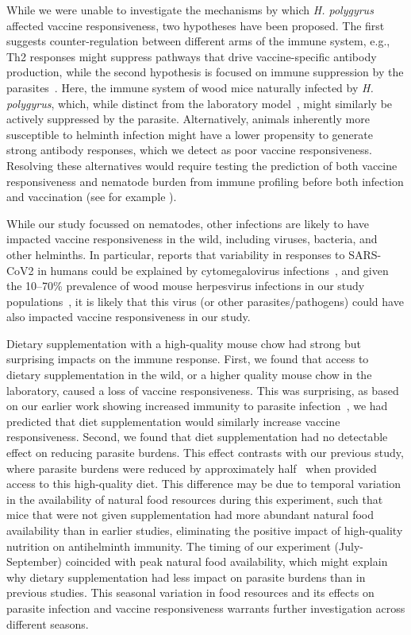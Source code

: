 \documentclass[a4paper, hidelinks, 11pt]{article}
\begin{document}
While we were unable to investigate the mechanisms by which \textit{H. polygyrus} affected vaccine responsiveness, two hypotheses have been proposed. The first suggests counter-regulation between different arms of the immune system, e.g., Th2 responses might suppress pathways that drive vaccine-specific antibody production\cite{Cao2016,Mosmann1996}, while the second hypothesis is focused on immune suppression by the parasites~\cite{Maizels2016, Maizels2012a}. Here, the immune system of wood mice naturally infected by \textit{H. polygyrus}, which, while distinct from the laboratory model~\cite{Stevens2023a}, might similarly be actively suppressed by the parasite. Alternatively, animals inherently more susceptible to helminth infection might have a lower propensity to generate strong antibody responses, which we detect as poor vaccine responsiveness. Resolving these alternatives would require testing the prediction of both vaccine responsiveness and nematode burden from immune profiling before both infection and vaccination (see for example \cite{Tsang2014, Kotliarov2020}).

While our study focussed on nematodes, other infections are likely to have impacted vaccine responsiveness in the wild, including viruses, bacteria, and other helminths. In particular, reports that variability in responses to SARS-CoV2 in humans could be explained by cytomegalovirus infections~\cite{Aquino2023}, and given the 10–70\% prevalence of wood mouse herpesvirus infections in our study populations~\cite{Knowles2012}, it is likely that this virus (or other parasites/pathogens) could have also impacted vaccine responsiveness in our study.

Dietary supplementation with a high-quality mouse chow had strong but surprising impacts on the immune response. First, we found that access to dietary supplementation in the wild, or a higher quality mouse chow in the laboratory, caused a loss of vaccine responsiveness. This was surprising, as based on our earlier work showing increased immunity to parasite infection~\cite{Sweeny2021}, we had predicted that diet supplementation would similarly increase vaccine responsiveness. Second, we found that diet supplementation had no detectable effect on reducing parasite burdens. This effect contrasts with our previous study, where parasite burdens were reduced by approximately half~\cite{Sweeny2021} when provided access to this high-quality diet. This difference may be due to temporal variation in the availability of natural food resources during this experiment, such that mice that were not given supplementation had more abundant natural food availability than in earlier studies, eliminating the positive impact of high-quality nutrition on antihelminth immunity. The timing of our experiment (July-September) coincided with peak natural food availability, which might explain why dietary supplementation had less impact on parasite burdens than in previous studies. This seasonal variation in food resources and its effects on parasite infection and vaccine responsiveness warrants further investigation across different seasons.
\end{document}
